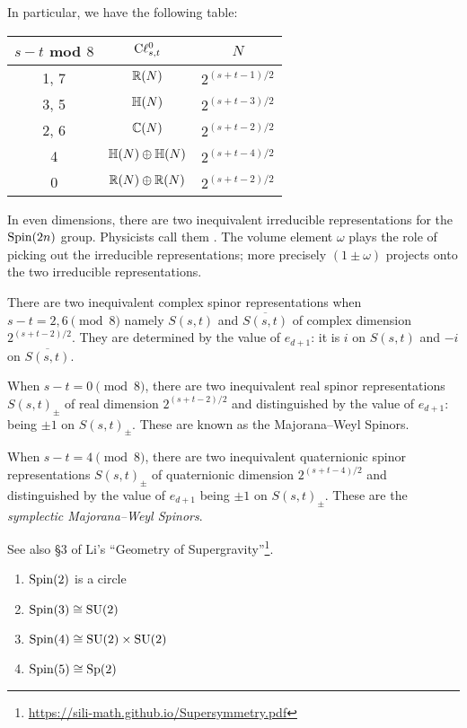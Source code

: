 In particular, we have the following table:

\begin{center}
\begin{tabular}{|c|c|c|} \hline
  $s-t$ mod $8$ & $\mathrm{C}\ell_{s,t}^{0}$ & $N$ \\\hline
           1, 7 &       $\mathbb{R}(N)$ & $2^{(s+t-1)/2}$\\
           3, 5 &       $\mathbb{H}(N)$ & $2^{(s+t-3)/2}$\\ \hline
           2, 6 &       $\mathbb{C}(N)$ & $2^{(s+t-2)/2}$\\
              4 & $\mathbb{H}(N)\oplus\mathbb{H}(N)$ & $2^{(s+t-4)/2}$\\
              0 & $\mathbb{R}(N)\oplus\mathbb{R}(N)$ & $2^{(s+t-2)/2}$\\ \hline
\end{tabular}
\end{center}

In even dimensions, there are two inequivalent irreducible
representations for the $\operatorname{Spin}(2n)$ group. Physicists call them
. The volume element $\omega$ plays the role of
picking out the irreducible representations; more precisely
$(1\pm\omega)$ projects onto the two irreducible representations.

\M
There are two inequivalent complex spinor representations when $s-t=2,6\pmod8$
namely $S(s,t)$ and $\overline{S(s,t)}$ of complex dimension
$2^{(s+t-2)/2}$. They are determined by the value of $e_{d+1}$: it is
$i$ on $S(s,t)$ and $-i$ on $\overline{S(s,t)}$.

When $s-t=0\pmod8$, there are two inequivalent real spinor
representations $S(s,t)_{\pm}$ of real dimension $2^{(s+t-2)/2}$ and
distinguished by the value of $e_{d+1}$: being $\pm1$ on $S(s,t)_{\pm}$.
These are known as the Majorana--Weyl Spinors.

When $s-t=4\pmod8$, there are two inequivalent quaternionic spinor
representations $S(s,t)_{\pm}$ of quaternionic dimension $2^{(s+t-4)/2}$
and distinguished by the value of $e_{d+1}$ being $\pm1$ on
$S(s,t)_{\pm}$.
These are the \emph{symplectic Majorana--Weyl Spinors}.

See also \S3 of Li's ``Geometry of Supergravity''\footnote{\url{https://sili-math.github.io/Supersymmetry.pdf}}.

\begin{example}
\begin{enumerate}
\item $\operatorname{Spin}(2)$ is a circle
\item $\operatorname{Spin}(3)\cong\operatorname{SU}(2)$
\item $\operatorname{Spin}(4)\cong\operatorname{SU}(2)\times\operatorname{SU}(2)$
\item $\operatorname{Spin}(5)\cong\operatorname{Sp}(2)$
\end{enumerate}
\end{example}

